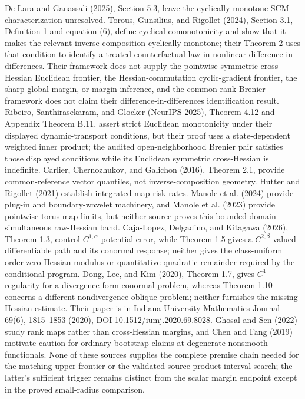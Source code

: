 \documentclass{article}
\begin{document}
De Lara and Ganassali (2025), Section 5.3, leave the cyclically monotone SCM characterization unresolved. Torous, Gunsilius, and Rigollet (2024), Section 3.1, Definition 1 and equation (6), define cyclical comonotonicity and show that it makes the relevant inverse composition cyclically monotone; their Theorem 2 uses that condition to identify a treated counterfactual law in nonlinear difference-in-differences. Their framework does not supply the pointwise symmetric-cross-Hessian Euclidean frontier, the Hessian-commutation cyclic-gradient frontier, the sharp global margin, or margin inference, and the common-rank Brenier framework does not claim their difference-in-differences identification result. Ribeiro, Santhirasekaram, and Glocker (NeurIPS 2025), Theorem 4.12 and Appendix Theorem B.11, assert strict Euclidean monotonicity under their displayed dynamic-transport conditions, but their proof uses a state-dependent weighted inner product; the audited open-neighborhood Brenier pair satisfies those displayed conditions while its Euclidean symmetric cross-Hessian is indefinite. Carlier, Chernozhukov, and Galichon (2016), Theorem 2.1, provide common-reference vector quantiles, not inverse-composition geometry. Hutter and Rigollet (2021) establish integrated map-risk rates. Manole et al. (2024) provide plug-in and boundary-wavelet machinery, and Manole et al. (2023) provide pointwise torus map limits, but neither source proves this bounded-domain simultaneous raw-Hessian band. Caja-Lopez, Delgadino, and Kitagawa (2026), Theorem 1.3, control \(C^{1,\alpha}\) potential error, while Theorem 1.5 gives a \(C^{2,\beta}\)-valued differentiable path and its conormal response; neither gives the class-uniform order-zero Hessian modulus or quantitative quadratic remainder required by the conditional program. Dong, Lee, and Kim (2020), Theorem 1.7, gives \(C^1\) regularity for a divergence-form conormal problem, whereas Theorem 1.10 concerns a different nondivergence oblique problem; neither furnishes the missing Hessian estimate. Their paper is in Indiana University Mathematics Journal 69(6), 1815--1853 (2020), DOI 10.1512/iumj.2020.69.8028. Ghosal and Sen (2022) study rank maps rather than cross-Hessian margins, and Chen and Fang (2019) motivate caution for ordinary bootstrap claims at degenerate nonsmooth functionals. None of these sources supplies the complete premise chain needed for the matching upper frontier or the validated source-product interval search; the latter's sufficient trigger remains distinct from the scalar margin endpoint except in the proved small-radius comparison.
\end{document}
